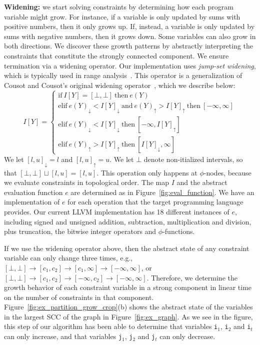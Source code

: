 \documentclass{sigplanconf}[10pt]
\newcommand{\lb}[1]{#1_{\downarrow}}
\newcommand{\ub}[1]{#1_{\uparrow}}
\begin{document}
\noindent
\textbf{Widening: } we start solving constraints by determining how each
program variable might grow.
For instance, if a variable is only updated by sums with positive numbers, then
it only grows up.
If, instead, a variable is only updated by sums with negative numbers, then it
grows down.
Some variables can also grow in both directions.
We discover these growth patterns by abstractly interpreting the constraints
that constitute the strongly connected component.
We ensure termination via a widening operator.
Our implementation uses {\em jump-set widening}, which is typically used in
range analysis~\cite[p.228]{Nielson99}.
This operator is a generalization of Cousot and Cousot's original widening
operator~\cite{Cousot77}, which we describe below:
%
\begin{equation*}
I[Y] =
\begin{cases}
\mbox{if} \ I[Y] = [\bot, \bot] \ \mbox{then} \ e(Y) \\
\mbox{elif} \ \lb{e(Y)} < \lb{I[Y]}  \ \mbox{and} \ \ub{e(Y)} > \ub{I[Y]} \ \mbox{then} \ [-\infty, \infty] \\
\mbox{elif} \ \lb{e(Y)} < \lb{I[Y]} \ \mbox{then} \ [-\infty, \ub{I[Y]}] \\
\mbox{elif} \ \ub{e(Y)} > \ub{I[Y]} \ \mbox{then} \ [\lb{I[Y]}, \infty]
\end{cases}
\end{equation*}
%
We let $\lb{[l, u]} = l$ and $\ub{[l, u]} = u$.
We let $\bot$ denote non-itialized intervals, so that $[\bot, \bot] \sqcup
[l, u] = [l, u]$.
This operation only happens at $\phi$-nodes, because we evaluate constraints in
topological order.
The map $I$ and the abstract evaluation function $e$ are determined as in
Figure~\ref{fig:eval_function}.
We have an implementation of $e$ for each operation that the
target programming language provides.
Our current LLVM implementation has 18 different instances of $e$, including
signed and unsigned addition, subtraction, multiplication and division, plus
truncation, the bitwise integer operators and $\phi$-functions.

If we use the widening operator above, then the abstract state of any constraint
variable can only change three times, e.g., $[\bot, \bot] \rightarrow [c_1, c_2]
\rightarrow [c_1, \infty] \rightarrow [-\infty, \infty]$, or
$[\bot, \bot] \rightarrow [c_1, c_2] \rightarrow [-\infty, c_2]
\rightarrow [-\infty, \infty]$.
Therefore, we determine the growth behavior of each constraint variable in
a strong component in linear time on the number of constraints in that
component.
Figure~\ref{fig:ex_partition_grow_crop}(b) shows the abstract state of the
variables in the largest SCC of the graph in Figure~\ref{fig:ex_graph}.
As we see in the figure, this step of our algorithm has been able to determine
that variables \texttt{i}$_1$, \texttt{i}$_2$ and \texttt{i}$_t$ can only
increase, and that variables \texttt{j}$_1$, \texttt{j}$_2$ and \texttt{j}$_t$
can only decrease.
\end{document}
